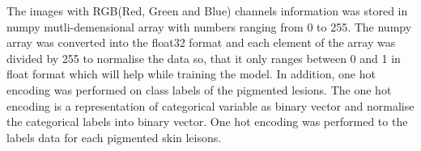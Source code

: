 The images with RGB(Red, Green and Blue) channels information was stored in numpy mutli-demensional array with numbers ranging from 0 to 255.
The numpy array was converted into the float32 format and each element of the array was divided by 255 to normalise the data so, that 
it only ranges between 0 and 1 in float format which will help while training the model. In addition, one hot encoding 
was performed on class labels of the pigmented lesions. The one hot encoding is a representation of categorical variable 
as binary vector and normalise the categorical labels into binary vector. One hot encoding was performed to the labels data for each 
pigmented skin leisons.